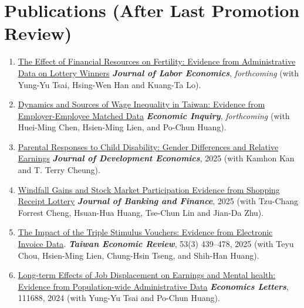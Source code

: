 \documentclass[10pt,letterpaper]{article}
\begin{document}
\section*{\textbf{Publications (After Last Promotion Review)}}

\begin{enumerate}

\item
\href{https://papers.ssrn.com/sol3/papers.cfm?abstract_id=4300448}{The Effect of Financial Resources on Fertility: Evidence from Administrative Data on Lottery Winners} \textit{\textbf{Journal of Labor Economics}}, \textit{forthcoming} (with Yung-Yu Tsai, Hsing-Wen Han and Kuang-Ta Lo).

\item
\href{https://www.dropbox.com/scl/fi/xigzri0wajwxznqpplb4c/Dynamics-and-Sources-of-Wage-Inequality-in-Taiwan-Evidence-from-Employer-Employee-Matched-Data.pdf?rlkey=6jwpdl3vgwgk82z9q75s9cgg3&dl=0}{Dynamics and Sources of Wage Inequality in Taiwan: Evidence from Employer-Employee Matched Data} \textit{\textbf{Economic Inquiry}}, \textit{forthcoming} (with Huei-Ming Chen, Hsien-Ming Lien, and Po-Chun Huang).

\item
\href{https://www.sciencedirect.com/science/article/abs/pii/S0304387825000112}{Parental Responses to Child Disability: Gender Differences and Relative Earnings} \textit{\textbf{Journal of Development Economics}}, 2025 (with Kamhon Kan and T. Terry Cheung).

\item
\href{https://www.sciencedirect.com/science/article/abs/pii/S0378426624002929}{Windfall Gains and Stock Market Participation Evidence from Shopping Receipt Lottery} \textit{\textbf{Journal of Banking and Finance}}, 2025 (with Tzu-Chang Forrest Cheng, Hsuan-Hua Huang, Tse-Chun Lin and Jian-Da Zhu).

\item
\href{https://doi.org/10.6277/TER.202509_53(3).0003}{The Impact of the Triple Stimulus Vouchers: Evidence from Electronic Invoice Data}. \textit{\textbf{Taiwan Economic Review}}, 53(3) 439--478, 2025 (with Teyu Chou, Hsien-Ming Lien, Chung-Hsin Tseng, and Shih-Han Huang).

\item
\href{https://www.dropbox.com/scl/fi/l9acw3h4gj8yzrdfav2w5/Job-Loss_Health_Full_v2.pdf?rlkey=bkgdf6v72teahl6jj4iq7b440&dl=0}{Long-term Effects of Job Displacement on Earnings and Mental health: Evidence from Population-wide Administrative Data} \textit{\textbf{Economics Letters}}, 111688, 2024 (with Yung-Yu Tsai and Po-Chun Huang).


\end{enumerate}
\end{document}
